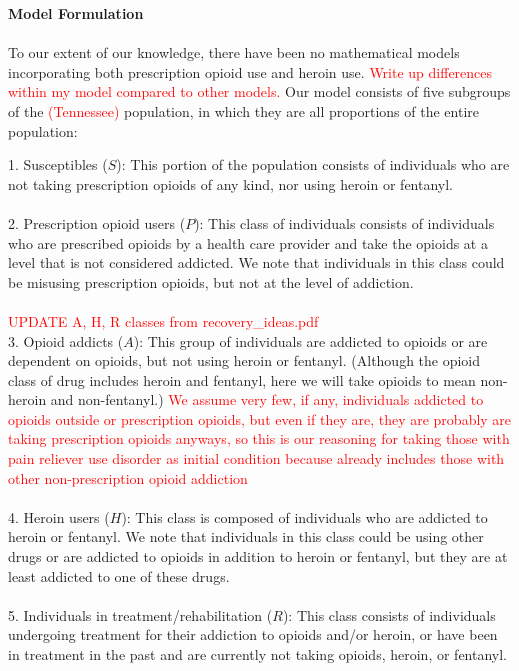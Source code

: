 \documentclass[12pt]{article}
\begin{document}
\textbf{Model Formulation} \\ \\
To our extent of our knowledge, there have been no mathematical models incorporating both prescription opioid use and heroin use. \textcolor{red}{Write up differences within my model compared to other models.}
Our model consists of five subgroups of the \textcolor{red}{(Tennessee)} population, in which they are all proportions of the entire population: 

1. Susceptibles ($S$): This portion of the population consists of individuals who are not taking prescription opioids of any kind, nor using heroin or fentanyl. \\ \\
2. Prescription opioid users ($P$): This class of individuals consists of individuals who are prescribed opioids by a health care provider and take the opioids at a level that is not considered addicted. We note that individuals in this class could be misusing prescription opioids, but not at the level of addiction.  \\ \\ %
\textcolor{red}{UPDATE A, H, R classes from recovery\_ideas.pdf} \\
3. Opioid addicts ($A$): This group of individuals are addicted to opioids or are dependent on opioids, but not using heroin or fentanyl. (Although the opioid class of drug includes heroin and fentanyl, here we will take opioids to mean non-heroin and non-fentanyl.) \textcolor{red}{We assume very few, if any, individuals addicted to opioids outside or prescription opioids, but even if they are, they are probably are taking prescription opioids anyways, so this is our reasoning for taking those with pain reliever use disorder as initial condition because already includes those with other non-prescription opioid addiction} \\ \\
4. Heroin users ($H$): This class is composed of individuals who are addicted to heroin or fentanyl. We note that individuals in this class could be using other drugs or are addicted to opioids in addition to heroin or fentanyl, but they are at least addicted to one of these drugs. \\ \\
5. Individuals in treatment/rehabilitation ($R$): This class consists of individuals undergoing treatment for their addiction to opioids and/or heroin, or have been in treatment in the past and are currently not taking opioids, heroin, or fentanyl.
\end{document}
